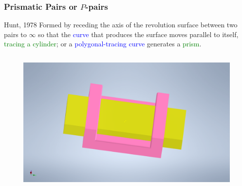 \begin{frame}
	\frametitle{Prismatic Pairs or $P$-pairs}
	\begin{block}{Hunt, 1978}
		\footnotesize{Formed by receding the axis of the revolution surface between two pairs to $\infty$ so that the \textcolor{blue}{curve} that produces the surface moves parallel to itself, \textcolor{green}{tracing a cylinder}; or a \textcolor{blue}{polygonal-tracing curve} generates a \textcolor{green}{prism}.}
	\end{block}
	\begin{columns}[t]		
		\begin{column}{.7\textwidth}
			\begin{figure}
				\centering
				\includegraphics[width=\textwidth]{../Notes/figures/prismatic_joint.pdf}
			\end{figure}
		\end{column}
	\end{columns}
\end{frame}

